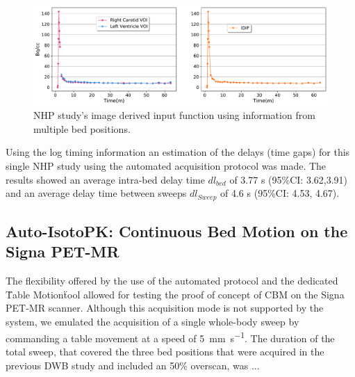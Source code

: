 %
%
\begin{figure} [ht!]
\centering
\includegraphics[scale=0.45,angle=0]{3_Results/3_1_DWB_Optimization/figures/3_1_NHP_InputFunction.pdf}
\caption{NHP study's image derived input function using information from multiple bed positions.}
\label{fig3_1:Macaque_PET}
\end{figure}
%
Using the log timing information an estimation of the delays (time gaps) for this single NHP study using the automated acquisition protocol was made. The results showed an average intra-bed delay time $dl_{bed}$ of 3.77 s (95\%CI: 3.62,3.91) and an average delay time between sweeps $dl_{Sweep}$ of 4.6 s (95\%CI: 4.53, 4.67).

\subsection{Auto-IsotoPK: Continuous Bed Motion on the Signa PET-MR}
The flexibility offered by the use of the automated protocol and the dedicated \"Table Motion\" tool allowed for testing the proof of concept of CBM on the Signa PET-MR scanner. Although this acquisition mode is not supported by the system, we emulated the acquisition of a single whole-body sweep by commanding a table movement at a speed of \SI{5}{\milli\metre\per\second}. The duration of the total sweep, that covered the three bed positions that were acquired in the previous DWB study and included an 50\% overscan, was ...